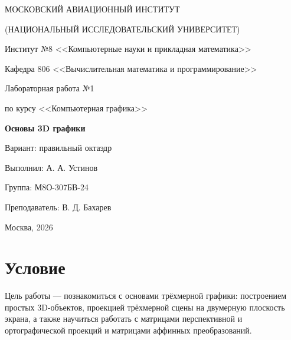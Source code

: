\documentclass[14pt,a4paper]{extarticle}
\newcommand{\Student}{А. А. Устинов}
\newcommand{\Group}{М8О-307БВ-24}
\newcommand{\Teacher}{В. Д. Бахарев}
\newcommand{\Year}{2026}
\begin{document}
\begin{titlepage}
	\centering

	МОСКОВСКИЙ АВИАЦИОННЫЙ ИНСТИТУТ\par
	(НАЦИОНАЛЬНЫЙ ИССЛЕДОВАТЕЛЬСКИЙ УНИВЕРСИТЕТ)\par

	\vspace{6mm}

	Институт №8 <<Компьютерные науки и прикладная математика>>\par
	Кафедра 806 <<Вычислительная математика и программирование>>\par

	\vspace{6cm}

	{\Large Лабораторная работа №1\par}
	\vspace{3mm}
	{\large по курсу <<Компьютерная графика>>\par}
	\vspace{8mm}
	{\Large\bfseries Основы 3D графики\par}
	\vspace{3mm}
	{\large Вариант: правильный октаэдр\par}

	\vspace{4cm}

	\begin{flushright}
		\begin{minipage}{0.5\textwidth}
			Выполнил: \Student\par
			Группа: \Group\par
			\vspace{6mm}
			Преподаватель: \Teacher\par
		\end{minipage}
	\end{flushright}

	\vfill
	Москва, \Year\par
\end{titlepage}

\section{Условие}

Цель работы — познакомиться с основами трёхмерной графики: построением простых
3D-объектов, проекцией трёхмерной сцены на двумерную плоскость экрана, а также
научиться работать с матрицами перспективной и ортографической проекций и
матрицами аффинных преобразований.
\end{document}
